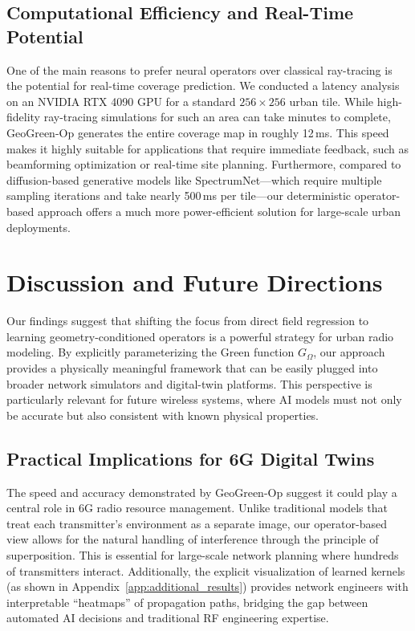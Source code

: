 \documentclass{article}
\begin{document}
\subsection{Computational Efficiency and Real-Time Potential}
\label{sec:exp_latency}
One of the main reasons to prefer neural operators over classical ray-tracing is the potential for real-time coverage prediction. We conducted a latency analysis on an NVIDIA RTX 4090 GPU for a standard $256 \times 256$ urban tile. While high-fidelity ray-tracing simulations for such an area can take minutes to complete, GeoGreen-Op generates the entire coverage map in roughly 12\,ms. This speed makes it highly suitable for applications that require immediate feedback, such as beamforming optimization or real-time site planning. Furthermore, compared to diffusion-based generative models like SpectrumNet—which require multiple sampling iterations and take nearly 500\,ms per tile—our deterministic operator-based approach offers a much more power-efficient solution for large-scale urban deployments.

\section{Discussion and Future Directions}
\label{sec:discussion}

Our findings suggest that shifting the focus from direct field regression to learning geometry-conditioned operators is a powerful strategy for urban radio modeling. By explicitly parameterizing the Green function $G_\Omega$, our approach provides a physically meaningful framework that can be easily plugged into broader network simulators and digital-twin platforms. This perspective is particularly relevant for future wireless systems, where AI models must not only be accurate but also consistent with known physical properties.

\subsection{Practical Implications for 6G Digital Twins}
The speed and accuracy demonstrated by GeoGreen-Op suggest it could play a central role in 6G radio resource management. Unlike traditional models that treat each transmitter's environment as a separate image, our operator-based view allows for the natural handling of interference through the principle of superposition. This is essential for large-scale network planning where hundreds of transmitters interact. Additionally, the explicit visualization of learned kernels (as shown in Appendix~\ref{app:additional_results}) provides network engineers with interpretable ``heatmaps'' of propagation paths, bridging the gap between automated AI decisions and traditional RF engineering expertise.
\end{document}
